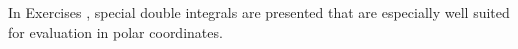 {\noindent In Exercises}
{, special double integrals are presented that are especially well suited for evaluation in polar coordinates.}

